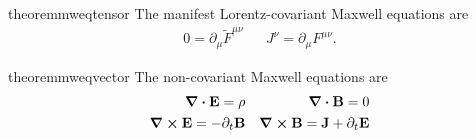 \begin{restatable}{theorem}{mweqtensor}\label{thm:tensor_maxwell_equations}
	The manifest Lorentz-covariant Maxwell equations are
	\begin{align}
		0
		=
		\partial_\mu
		\tilde{F}^{\mu\nu}
		&&
		J^\nu
		=
		\partial_\mu
		F^{\mu\nu}
		.
	\end{align}
\end{restatable}
\begin{restatable}{theorem}{mweqvector}\label{thm:vector_maxwell_equations}
	The non-covariant Maxwell equations are
	\begin{align}
		\div\vb{E}
		=
		\rho
		&&
		\div\vb{B}
		=
		0
		\label{eq:mw_homo_vec}
		\\
		\curl\vb{E}
		=
		-
		\partial_t\vb{B}
		&&
		\curl\vb{B}
		=
		\vb{J}
		+
		\partial_t\vb{E}
		\label{eq:mw_inhomo_vec}
	\end{align}
\end{restatable}

